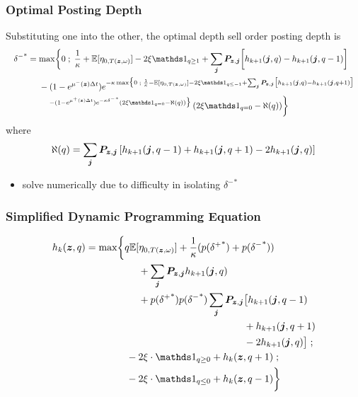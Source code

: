 \begin{frame}
\frametitle{Optimal Posting Depth}
Substituting one into the other, the optimal depth sell order posting depth is
\[
\resizebox{\textwidth}{!}{$\displaystyle
\begin{aligned}
{\delta^-}^* & = \max \biggl\lbrace 0 \; ; \; \frac{1}{\kappa} + \E[\eta_{0,T(\bz, \omega)}] - 2 \xi \indicator_{q \geq 1} + \sum_{\bj} \bP_{\bz,\bj} \biggl[ h_{k+1}(\bj, q) - h_{k+1}(\bj, q-1) \biggr] \\
& \hphantom{{}={}} - (1-e^{\mu^-(\bz) \Delta t})e^{-\kappa \max \bigl\lbrace 0 \; ; \; \frac{1}{\kappa} - \E[\eta_{0,T(\bz, \omega)}] - 2 \xi \indicator_{q \leq -1} + \sum_{\bj} \bP_{\bz,\bj} \bigl[ h_{k+1}(\bj, q) - h_{k+1}(\bj, q+1) \bigr]} \\
& \hphantom{{}={} {}-{}} {}^{-(1-e^{\mu^+ (\bz) \Delta t})e^{-\kappa {\delta^-}^*} \left( 2 \xi \indicator_{q = 0} - \aleph(q) \right) \bigr\rbrace } \left( 2 \xi \indicator_{q = 0} - \aleph(q) \right) \biggr\rbrace
\end{aligned}
$}
\]
where
\[ \aleph(q) = \sum_{\bm{j}} \bm{P}_{\bm{z},\bm{j}} \left[ h_{k+1}(\bm{j}, q-1) + h_{k+1}(\bm{j}, q+1) -2 h_{k+1}(\bm{j}, q)  \right] \]
\begin{itemize}
\item solve numerically due to difficulty in isolating ${\delta^{-}}^*$
\end{itemize}
\end{frame}

\begin{frame}
\frametitle{Simplified Dynamic Programming Equation}
\[
\begin{aligned}
h_k(\bz,q) & = \max \biggl\lbrace 
q\E[\eta_{0,T(\bz, \omega)}] + \frac{1}{\kappa}(p({\delta^+}^*)+p({\delta^-}^*)) \\
& \hphantom{{}={} \max \biggl\lbrace {}+{}} + \sum_{\bj} \bP_{\bz,\bj} h_{k+1}(\bj,q) \\ 
& \hphantom{{}={} \max \biggl\lbrace {}+{}} + p({\delta^+}^*)p({\delta^-}^*)\sum_{\bj} \bP_{\bz,\bj} \bigl[ h_{k+1}(\bj, q-1) \\
& \hphantom{{}={} \max \biggl\lbrace {}+{} + p({\delta^+}^*)p({\delta^-}^*)\sum_{\bj} \bP_{\bz,\bj}} + h_{k+1}(\bj, q+1) \\
& \hphantom{{}={} \max \biggl\lbrace {}+{} + p({\delta^+}^*)p({\delta^-}^*)\sum_{\bj} \bP_{\bz,\bj}} -2 h_{k+1}(\bj, q)  \bigr] \; ; \\
& \hphantom{{}={} \max \biggl\lbrace } -2\xi \cdot \indicator_{q \geq 0} + h_k(\bz,q+1) \; ; \\
& \hphantom{{}={} \max \biggl\lbrace } -2\xi \cdot \indicator_{q \leq 0} + h_k(\bz,q-1) \biggr\rbrace
\end{aligned}
\]
\end{frame}

